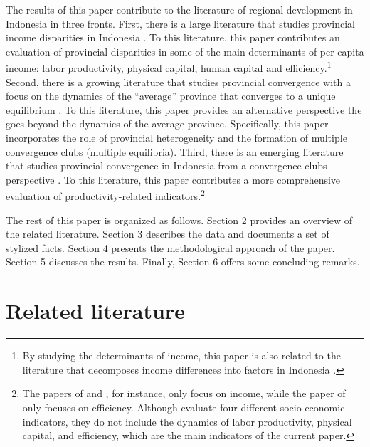 \documentclass[11pt,a4paper,]{article}
\begin{document}
The results of this paper contribute to the literature of regional development in Indonesia in three fronts.
First, there is a large literature that studies provincial income disparities in Indonesia \autocite{akita1988regional,mishra2009economic,akita2011structural}.
To this literature, this paper contributes an evaluation of provincial disparities in some of the main determinants of per-capita income: labor productivity, physical capital, human capital and efficiency.\footnote{By studying the determinants of income, this paper is also related to the literature that decomposes income differences into factors in Indonesia \autocite{akitaLukman1995,kataoka2010factor,kataoka2018inequality}.}
Second, there is a growing literature that studies provincial convergence with a focus on the dynamics of the ``average'' province that converges to a unique equilibrium \autocite{garcia1998differences,resosudarmo2006regional,vidyattama2013regional}.
To this literature, this paper provides an alternative perspective the goes beyond the dynamics of the average province.
Specifically, this paper incorporates the role of provincial heterogeneity and the formation of multiple convergence clubs (multiple equilibria).
Third, there is an emerging literature that studies provincial convergence in Indonesia from a convergence clubs perspective \autocite{gunawan2019provinces,kurniawan2019poor,mendez2020efficiencyConvergence}.
To this literature, this paper contributes a more comprehensive evaluation of productivity-related indicators.\footnote{The papers of \textcite{sakamoto2007} and \textcite{gunawan2019provinces}, for instance, only focus on income, while the paper of \textcite{mendez2019efficiencyIndonesia} only focuses on efficiency. Although \textcite{kurniawan2019poor} evaluate four different socio-economic indicators, they do not include the dynamics of labor productivity, physical capital, and efficiency, which are the main indicators of the current paper.}

The rest of this paper is organized as follows.
Section 2 provides an overview of the related literature.
Section 3 describes the data and documents a set of stylized facts.
Section 4 presents the methodological approach of the paper.
Section 5 discusses the results.
Finally, Section 6 offers some concluding remarks.

\hypertarget{related-literature}{%
\section{Related literature}\label{related-literature}}
\end{document}
